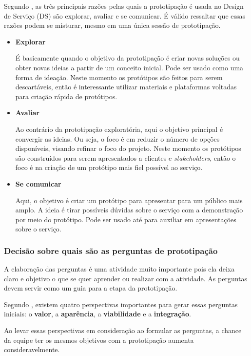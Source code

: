 Segundo \cite{Stickdorn2019}, as três principais razões pelas quais a prototipação é usada no Design de Serviço (DS) são explorar, avaliar e se comunicar. É válido ressaltar que essas razões podem se misturar, mesmo em uma única sessão de prototipação.

\begin{itemize}
	\item \textbf{Explorar}
	
	É basicamente quando o objetivo da prototipação é criar novas soluções ou obter novas ideias a partir de um conceito inicial. Pode ser usado como uma forma de ideação. Neste momento os protótipos são feitos para serem descartáveis, então é interessante utilizar materiais e plataformas voltadas para criação rápida de protótipos.
	
	\item \textbf{Avaliar}
	
	Ao contrário da prototipação exploratória, aqui o objetivo principal é convergir as ideias. Ou seja, o foco é em reduzir o número de opções disponíveis, visando refinar o foco do projeto. Neste momento os protótipos são construídos para serem apresentados a clientes e \textit{stakeholders}, então o foco é na criação de um protótipo mais fiel possível ao serviço.
	
	\item \textbf{Se comunicar}
	
	Aqui, o objetivo é criar um protótipo para apresentar para um público mais amplo. A ideia é tirar possíveis dúvidas sobre o serviço com a demonstração por meio do protótipo. Pode ser usado até para auxiliar em apresentações sobre o serviço.
\end{itemize}

\subsubsection{Decisão sobre quais são as perguntas de prototipação}

A elaboração das perguntas é uma atividade muito importante pois ela deixa claro e objetivo o que se quer aprender ou realizar com a atividade. As perguntas devem servir como um guia para a etapa da prototipação.

Segundo \cite{Stickdorn2019}, existem quatro perspectivas importantes para gerar essas perguntas iniciais: o \textbf{valor}, a \textbf{aparência}, a \textbf{viabilidade} e a \textbf{integração}. 

Ao levar essas perspectivas em consideração ao formular as perguntas, a chance da equipe ter os mesmos objetivos com a prototipação aumenta consideravelmente.

